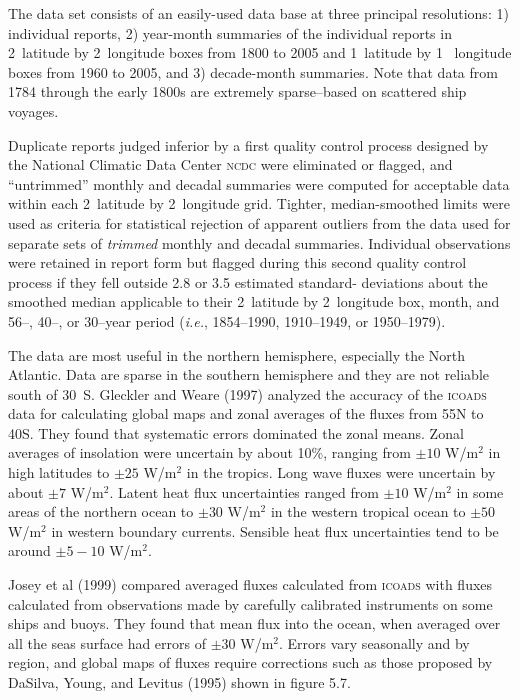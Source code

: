 The data set consists of an easily-used data base at three principal
resolutions: 1) individual reports, 2) year-month summaries of the
individual reports in 2\degrees \ latitude by 2\degrees \ longitude
boxes from 1800 to 2005 and 1\degrees \ latitude by 1\degrees
\ longitude boxes from 1960 to 2005, and 3) decade-month
summaries. Note that data from 1784 through the early 1800s are
extremely sparse--based on scattered ship voyages.

Duplicate reports judged inferior by a first quality control process
designed by the National Climatic Data Center \textsc{ncdc} were
eliminated or flagged, and ``untrimmed'' monthly and decadal summaries
were computed for acceptable data within each 2\degrees\ latitude by
2\degrees\ longitude grid. Tighter, median-smoothed limits were used
as criteria for statistical rejection of apparent outliers from the
data used for separate sets of \textit{trimmed} monthly and decadal
summaries. Individual observations were retained in report form but
flagged during this second quality control process if they fell
outside 2.8 or 3.5 estimated standard- deviations about the smoothed
median applicable to their 2\degrees\ latitude by 2\degrees\ longitude
box, month, and 56--, 40--, or 30--year period (\textit{i.e.},
1854--1990, 1910--1949, or 1950--1979).

The data are most useful in the northern hemisphere, especially the
North Atlantic.  Data are sparse in the southern hemisphere and they
are not reliable south of 30\degrees\ S. Gleckler and Weare (1997)
analyzed the accuracy of the
\textsc{icoads} data for calculating global maps and zonal averages of
the fluxes from 55\degrees N to 40\degrees S. They found that
systematic errors dominated the zonal means. Zonal averages of
insolation were uncertain by about
10\%, ranging from $\pm 10$ W/m$^2$ in high latitudes to $\pm 25$
W/m$^2$ in the tropics. Long wave fluxes were uncertain by about $\pm
7$ W/m$^2$. Latent heat flux uncertainties ranged from $\pm 10$
W/m$^2$ in some areas of the northern ocean to $\pm 30$ W/m$^2$ in the
western tropical ocean to $\pm 50$ W/m$^2$ in western boundary
currents. Sensible heat flux
uncertainties tend to be around $\pm 5- 10$ W/m$^2$.

Josey et al (1999) compared averaged fluxes calculated from
\textsc{icoads} with fluxes calculated from observations made by
carefully calibrated instruments on some ships and buoys. They found
that mean flux into the ocean, when averaged over all the seas surface
had errors of $\pm 30$ W/m$^2$. Errors vary seasonally and by region,
and global maps of fluxes require corrections such as those proposed
by DaSilva, Young, and Levitus (1995) shown in figure 5.7.

